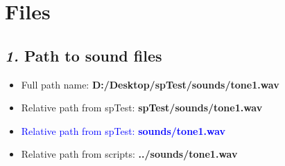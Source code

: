 \documentclass[12pt, english]{article}
\newcommand{\mysection}[2]{\setcounter{section}{#1}\addtocounter{section}{-1}\section{#2}}
\begin{document}

\mysection{4}{Files}
\vspace{10pt}

\subsection*{\emph{1.} Path to sound files} 
\vspace{10pt}

\begin{itemize}
    \item Full path name: \textbf{D:/Desktop/spTest/sounds/tone1.wav}
    \item Relative path from spTest: \textbf{spTest/sounds/tone1.wav}
    \item \textcolor{blue}{Relative path from spTest: \textbf{sounds/tone1.wav}}
    \item Relative path from scripts: \textbf{../sounds/tone1.wav}
\end{itemize} 


\end{document}
